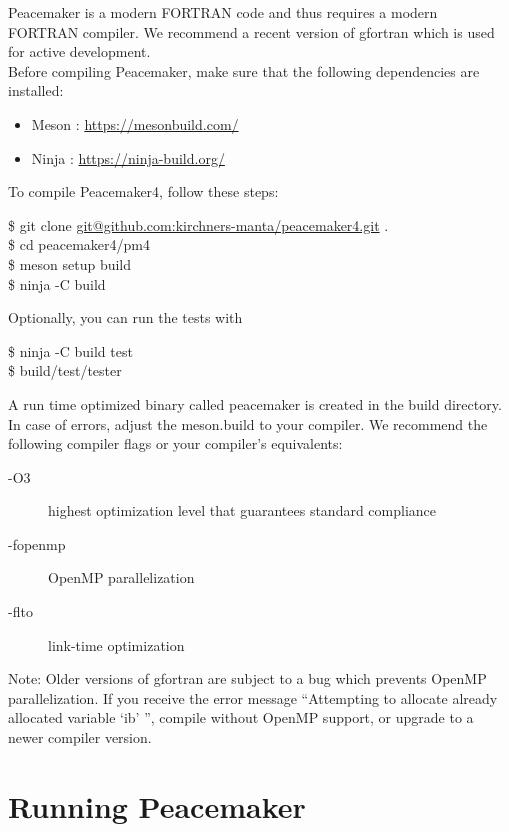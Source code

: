 \documentclass{scrartcl}
\begin{document}
Peacemaker is a modern FORTRAN code and thus requires a modern FORTRAN compiler.
We recommend a recent version of gfortran which is used for active development. \\
Before compiling Peacemaker, make sure that the following dependencies are installed:
\begin{itemize}
    \item Meson : \url{https://mesonbuild.com/}
    \item Ninja : \url{https://ninja-build.org/}
\end{itemize}
To compile Peacemaker4, follow these steps:
\begin{addmargin}[1cm]{0cm}
    \ttfamily
    \$ git clone
    \url{git@github.com:kirchners-manta/peacemaker4.git} .\\
    \$ cd peacemaker4/pm4 \\
    \$ meson setup build \\
    \$ ninja -C build 
\end{addmargin}
Optionally, you can run the tests with
\begin{addmargin}[1cm]{0cm}
    \ttfamily
    \$ ninja -C build test \\
    \$ build/test/tester
\end{addmargin}

A run time optimized binary called peacemaker is created in the build directory.
In case of errors, adjust the meson.build to your compiler.
We recommend the following compiler flags or your compiler's equivalents:
\begin{addmargin}[1cm]{0cm}
    \begin{description}
        \item[-O3] highest optimization level that guarantees standard compliance
        \item[-fopenmp] OpenMP parallelization
        \item[-flto] link-time optimization
    \end{description}
\end{addmargin}

Note: Older versions of gfortran are subject to a bug which prevents OpenMP parallelization.
If you receive the error message ``Attempting to allocate already allocated variable `ib' '', 
compile without OpenMP support, or upgrade to a newer compiler version.

\section{Running Peacemaker}
\end{document}
